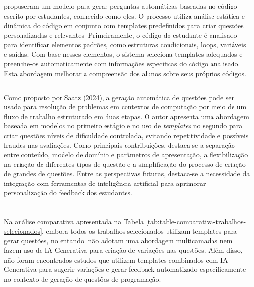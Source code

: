 \subsection{}
\cite {lehtinen2021} propuseram um modelo para gerar perguntas automáticas baseadas no código escrito por estudantes, conhecido como  \gls{qlcs}. O processo utiliza análise estática e dinâmica do código em conjunto com templates predefinidos para criar questões personalizadas e relevantes. Primeiramente, o código do estudante é analisado para identificar elementos padrões, como estruturas condicionais, loops, variáveis e saídas. Com base nesses elementos, o sistema seleciona templates adequados e preenche-os automaticamente com informações específicas do código analisado. Esta abordagem melhorar a compreensão dos alunos sobre seus próprios códigos. 

 \subsection{}
Como proposto por Saatz (2024), a geração automática de questões pode ser usada para resolução de problemas em contextos de computação  por meio de um fluxo de trabalho estruturado em duas etapas. O autor apresenta uma abordagem baseada em modelos no primeiro estágio e no uso de \textit{templates}  no segundo para criar questões níveis de dificuldade controlada, evitando repetitividade e possíveis fraudes nas avaliações. Como principais contribuições, destaca-se a separação entre conteúdo, modelo de domínio e parâmetros de apresentação, a flexibilização na criação de diferentes tipos de questão e a simplificação do processo de criação de grandes de questões. Entre as perspectivas futuras, destaca-se a necessidade da integração com ferramentas de inteligência artificial para aprimorar personalização do feedback dos estudantes. 


\section{}

Na análise comparativa apresentada na Tabela \ref{tab:table-comparativa-trabalhos-selecionados}, embora todos os trabalhos selecionados utilizam templates para gerar questões, no entando, não adotam uma abordagem multicamadas nem fazem uso de IA Generativa para criação de variações nas questões. Além disso, não foram encontrados estudos que utilizem templates combinados com IA Generativa para sugerir variações e gerar feedback automatizado especificamente no contexto de geração de questões de programação. 

